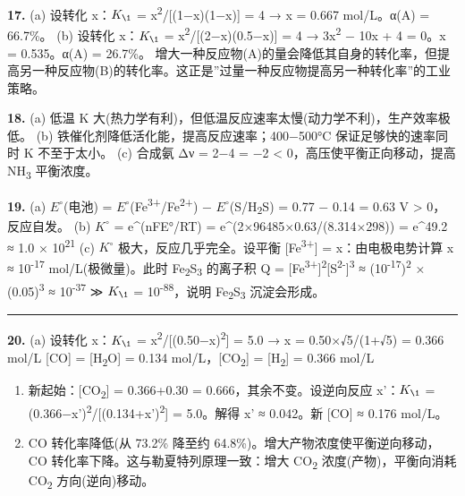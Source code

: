 \textbf{17.}
(a) 设转化 x：\(K_{\1}\) = x\textsuperscript{2}/{[}(1−x)(1−x){]} = 4 → x = 0.667 mol/L。α(A) = 66.7\%。
(b) 设转化 x：\(K_{\1}\) = x\textsuperscript{2}/{[}(2−x)(0.5−x){]} = 4 → 3x\textsuperscript{2} − 10x + 4 = 0。x = 0.535。α(A) = 26.7\%。
增大一种反应物(A)的量会降低其自身的转化率，但提高另一种反应物(B)的转化率。这正是''过量一种反应物提高另一种转化率''的工业策略。

\textbf{18.}
(a) 低温 K 大(热力学有利)，但低温反应速率太慢(动力学不利)，生产效率极低。
(b) 铁催化剂降低活化能，提高反应速率；400−500°C 保证足够快的速率同时 K 不至于太小。
(c) 合成氨 Δν = 2−4 = −2 \textless{} 0，高压使平衡正向移动，提高 NH\textsubscript{3} 平衡浓度。

\textbf{19.}
(a) \(E^{\circ}\)(电池) = \(E^{\circ}\)(Fe\textsuperscript{3+}/Fe\textsuperscript{2+}) − \(E^{\circ}\)(S/H\textsubscript{2}S) = 0.77 − 0.14 = 0.63 V \textgreater{} 0，反应自发。
(b) \(K^{\circ}\) = e\^{}(nFE°/RT) = e\^{}(2×96485×0.63/(8.314×298)) = e\^{}49.2 ≈ 1.0 × 10\textsuperscript{21}
(c) \(K^{\circ}\) 极大，反应几乎完全。设平衡 {[}Fe\textsuperscript{3+}{]} = x：由电极电势计算 x ≈ 10\textsuperscript{-17} mol/L(极微量)。此时 Fe\textsubscript{2}S\textsubscript{3} 的离子积 Q = {[}Fe\textsuperscript{3+}{]}\textsuperscript{2}{[}S\textsuperscript{2-}{]}\textsuperscript{3} ≈ (10\textsuperscript{-17})\textsuperscript{2} × (0.05)\textsuperscript{3} ≈ 10\textsuperscript{-37} ≫ \(K_{\1}\) = 10\textsuperscript{-88}，说明 Fe\textsubscript{2}S\textsubscript{3} 沉淀会形成。

\begin{center}\rule{0.5\linewidth}{0.5pt}\end{center}

\textbf{20.}
(a) 设转化 x：\(K_{\1}\) = x\textsuperscript{2}/{[}(0.50−x)\textsuperscript{2}{]} = 5.0 → x = 0.50×√5/(1+√5) = 0.366 mol/L
{[}CO{]} = {[}H\textsubscript{2}O{]} = 0.134 mol/L，{[}CO\textsubscript{2}{]} = {[}H\textsubscript{2}{]} = 0.366 mol/L

\begin{enumerate}
\def\labelenumi{(\alph{enumi})}
\setcounter{enumi}{1}
\item
  新起始：{[}CO\textsubscript{2}{]} = 0.366+0.30 = 0.666，其余不变。设逆向反应 x'：\(K_{\1}\) = (0.366−x')\textsuperscript{2}/{[}(0.134+x')\textsuperscript{2}{]} = 5.0。解得 x' ≈ 0.042。新 {[}CO{]} ≈ 0.176 mol/L。
\item
  CO 转化率降低(从 73.2\% 降至约 64.8\%)。增大产物浓度使平衡逆向移动，CO 转化率下降。这与勒夏特列原理一致：增大 CO\textsubscript{2} 浓度(产物)，平衡向消耗 CO\textsubscript{2} 方向(逆向)移动。
\end{enumerate}

